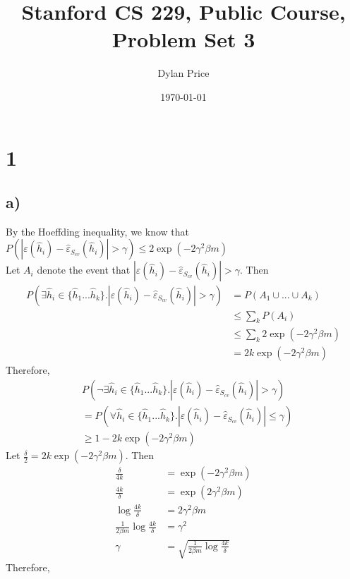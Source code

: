 \documentclass[11pt]{article}
\begin{document}
\title{Stanford CS 229, Public Course, Problem Set 3}
\date{\today}
\author{Dylan Price}
\maketitle 

\newcommand{\hhat}[1][]{\hat{h}_#1}
\newcommand{\CvtError}[0]{\hat{\varepsilon}_{S_{cv}}}
\newcommand{\GError}[0]{\varepsilon}
\newcommand{\pder}[2]{\frac{\partial#1}{\partial#2}}

\section*{1}

\subsection*{a)}
By the Hoeffding inequality, we know that \\

$P(|\GError(\hhat{i}) - \CvtError(\hhat{i})| > \gamma) \le 2\exp(-2 \gamma^2 \beta m) $ \\

Let $A_i$ denote the event that $|\GError(\hhat{i}) - \CvtError(\hhat{i})| > \gamma$. Then \\
\begin{align*}
    P(\exists \hhat{i} \in \{\hhat{1}...\hhat{k}\}. |\GError(\hhat{i}) - \CvtError(\hhat{i})| > \gamma) 
        &= P(A_1 \cup ... \cup A_k) \\
        &\le \sum_k P(A_i) \\
        &\le \sum_k 2\exp(-2 \gamma^2 \beta m) \\
        &= 2k \exp(-2 \gamma^2 \beta m)
\end{align*}
Therefore, \begin{align*}
    &P(\neg \exists \hhat{i} \in \{\hhat{1}...\hhat{k}\}. |\GError(\hhat{i}) - \CvtError(\hhat{i})| > \gamma) \\
    &= P(\forall \hhat{i} \in \{\hhat{1}...\hhat{k}\}. |\GError(\hhat{i}) - \CvtError(\hhat{i})| \le \gamma) \\
    &\geq 1 - 2k\exp(-2 \gamma^2 \beta m)
\end{align*}
Let $\frac{\delta}{2} = 2k\exp(-2 \gamma^2 \beta m)$. Then
\begin{align*}
                          \frac{\delta}{4k} &= \exp(-2 \gamma^2 \beta m) \\
                          \frac{4k}{\delta} &= \exp(2 \gamma^2 \beta m) \\
                     \log \frac{4k}{\delta} &= 2 \gamma^2 \beta m \\
 \frac{1}{2 \beta m} \log \frac{4k}{\delta} &= \gamma^2 \\
                                     \gamma &= \sqrt{\frac{1}{2 \beta m} \log \frac{4k}{\delta}}
\end{align*}
Therefore,
\end{document}
